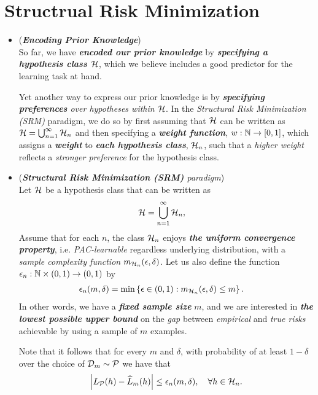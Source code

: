 \documentclass[11pt]{article}
\begin{document}
\section{Structrual Risk Minimization}
\begin{itemize}
\item \begin{remark} (\emph{\textbf{Encoding Prior Knowledge}})\\
So far, we have \emph{\textbf{encoded our prior knowledge}} by \emph{\textbf{specifying a hypothesis class ${\mathcal H}$}}, which we believe includes a good predictor for the learning task at hand. 

Yet another way to express our prior knowledge is by \emph{\textbf{specifying preferences} over hypotheses within ${\mathcal H}$}. In the \emph{Structural Risk Minimization (SRM)} paradigm, we do so by first assuming that ${\mathcal H}$ can be written as ${\mathcal H} = \bigcup_{n = 1}^{\infty}{\mathcal H}_n$ and then specifying a \emph{\textbf{weight function}}, $w : {\mathbb N} \to [0,1]$, which assigns a \emph{\textbf{weight}} to \emph{\textbf{each hypothesis class}}, ${\mathcal H}_n$, such that a \emph{higher weight} reflects a \emph{stronger preference} for the hypothesis class. 
\end{remark}

\item \begin{definition} (\emph{\textbf{Structural Risk Minimization (SRM)} paradigm})\\
Let ${\mathcal H}$ be a hypothesis class that can be written as 
\begin{align*}
{\mathcal H} &= \bigcup_{n = 1}^{\infty}{\mathcal H}_n,
\end{align*} Assume that for each $n$, the class ${\mathcal H}_n$ enjoys \emph{\textbf{the uniform convergence property}}, i.e. \emph{PAC-learnable} regardless underlying distribution, with a \emph{sample complexity function} $m_{{\mathcal H}_n}(\epsilon, \delta)$. Let us also define the function $\epsilon_n: {\mathbb N} \times (0,1) \to (0,1)$ by
\begin{align}
\epsilon_n(m, \delta) &= \min\left\{\epsilon \in (0,1):  m_{{\mathcal H}_n}(\epsilon, \delta) \le m\right\}. \label{eqn: srm_uniform_error}
\end{align} In other words, we have a \emph{\textbf{fixed sample size}} $m$, and we are interested in \emph{\textbf{the lowest possible upper bound}} on the \emph{gap} between \emph{empirical} and \emph{true risks} achievable by using a sample of $m$ examples. 

Note that  it follows that for every $m$ and $\delta$, with probability of at least $1 - \delta$ over the choice of ${\mathcal D}_{m} \sim {\mathcal P}$ we have that
\begin{align*}
\left\lvert L_{{\mathcal P}}(h) - \widehat{L}_{m}(h) \right\rvert \le \epsilon_n(m, \delta), \quad \forall h \in {\mathcal H}_n.
\end{align*}


\end{definition}
\end{itemize}
\end{document}
